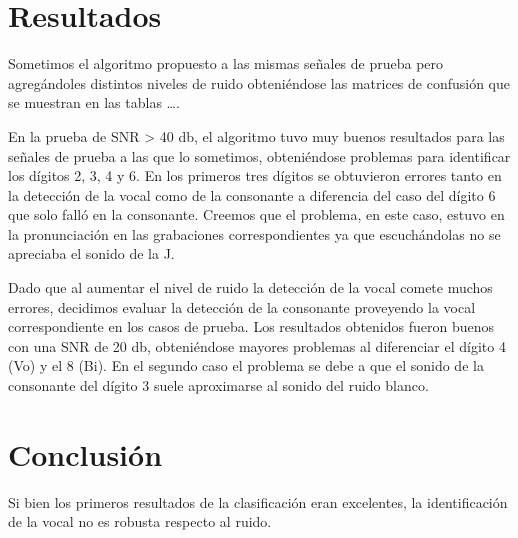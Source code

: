 \documentclass[conference,a4paper,10pt,oneside,final]{tfmpd}
\begin{document}
\section{Resultados}

Sometimos el algoritmo propuesto a las mismas señales de prueba pero
agregándoles distintos niveles de ruido obteniéndose las matrices de
confusión que se muestran en las tablas ….

En la prueba de SNR > 40 db, el algoritmo tuvo muy buenos resultados
para las señales de prueba a las que lo sometimos, obteniéndose
problemas para identificar los dígitos 2, 3, 4 y 6. En los primeros tres
dígitos se obtuvieron errores tanto en la detección de la vocal como
de la consonante a diferencia del caso del dígito 6 que solo falló
en la consonante. Creemos que el problema, en este caso, estuvo en la
pronunciación en las grabaciones correspondientes ya que escuchándolas
no se apreciaba el sonido de la J.

Dado que al aumentar el nivel de ruido la detección de la vocal
comete muchos errores, decidimos evaluar la detección de la consonante
proveyendo la vocal correspondiente en los casos de prueba. Los resultados
obtenidos fueron buenos con una SNR de 20 db, obteniéndose mayores
problemas al diferenciar  el dígito 4 (Vo) y el 8 (Bi). En el segundo
caso el problema se debe a que el sonido de la consonante del dígito
3 suele aproximarse al sonido del ruido blanco.

\section{Conclusión}

Si bien los primeros resultados de la clasificación eran excelentes,
la identificación de la vocal no es robusta respecto al ruido.


\nocite{*}  
\end{document}
